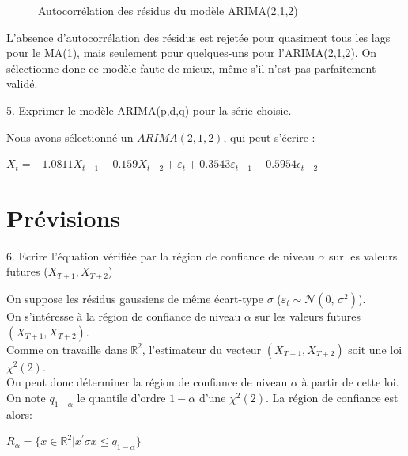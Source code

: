 \documentclass[a4paper, 12pt]{article} %
\begin{document}
\begin{figure}[h]
    \centering
    \caption{Autocorrélation des résidus du modèle ARIMA(2,1,2)}
\end{figure}
\normalsize{
{L'absence d'autocorrélation des résidus est rejetée pour quasiment tous les lags pour le MA(1), mais seulement pour quelques-uns pour l'ARIMA(2,1,2). On sélectionne donc ce modèle faute de mieux, même s'il n'est pas parfaitement validé.
}}
\begin{tcolorbox}
{\small
5. Exprimer le modèle ARIMA(p,d,q) pour la série choisie.}
\end{tcolorbox}
\normalsize
{Nous avons sélectionné un $ARIMA(2, 1, 2)$, qui peut s'écrire :
\begin{center}
$X_t = -1.0811 X_{t-1} - 0.159 X_{t-2} + \varepsilon_t + 0.3543 \varepsilon_{t-1} - 0.5954\epsilon_{t-2}$
\end{center}
}

\section{Prévisions}
\begin{tcolorbox}
{\small
6. Ecrire l’équation vérifiée par la région de confiance de niveau \textbf{$\alpha$} sur les valeurs futures ($X_{T+1}, X_{T+2}$)}
\end{tcolorbox}
\normalsize
{On suppose les résidus gaussiens de même écart-type $\sigma$ ($\varepsilon_t \sim \mathcal{N}(0,\,\sigma^{2})$). 
\\

On s'intéresse à la région de confiance de niveau $\alpha$ sur les valeurs futures $(X_{T+1}, X_{T+2})$. 
\\

Comme on travaille dans $\mathbb{R}^2$, l'estimateur du vecteur $(X_{T+1}, X_{T+2})$ soit une loi $\chi^2(2)$.
\\

On peut donc déterminer la région de confiance de niveau $\alpha$ à partir de cette loi.
\\

On note $q_{1- \alpha}$ le quantile d'ordre $1 - \alpha$ d'une $\chi^2(2)$. La région de confiance est alors:
\begin{center} 
$R_{\alpha} = \lbrace x \in \mathbb{R}^2 | x^{\prime} \sigma x \leqslant q_{1-\alpha} \rbrace$
\end{center}
}
\end{document}
